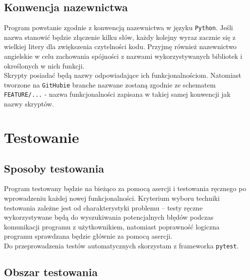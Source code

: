 \documentclass[a4paper,12pt]{article}
\begin{document}
\subsection{Konwencja nazewnictwa}

Program powstanie zgodnie z konwencją nazewnictwa w języku \texttt{Python}. Jeśli nazwa stanowić będzie złączenie kilku słów, każdy kolejny wyraz zacznie się z wielkiej litery dla zwiększenia czytelności kodu. Przyjmę również nazewnictwo angielskie w celu zachowania spójności z nazwami wykorzystywanych bibliotek i określonych w nich funkcji.\\

Skrypty posiadać będą nazwy odpowiadające ich funkcjonalnościom. Natomiast tworzone na \texttt{GitHubie} branche nazwane zostaną zgodnie ze schematem \texttt{FEATURE/...} - nazwa funkcjonalności zapisana w takiej samej konwencji jak nazwy skryptów.
 
\section{Testowanie}

\subsection{Sposoby testowania}

Program testowany będzie na bieżąco za pomocą asercji i testowania ręcznego po wprowadzeniu każdej nowej funkcjonalności. Kryterium wyboru techniki testowania zależne jest od charakterystyki problemu – testy ręczne wykorzystywane będą do wyszukiwania potencjalnych błędów podczas komunikacji programu z użytkownikiem, natomiast poprawność logiczna programu sprawdzana będzie głównie za pomocą asercji.\\

Do przeprowadzenia testów automatycznych skorzystam z frameworka \texttt{pytest}.


\subsection{Obszar testowania}
\end{document}

